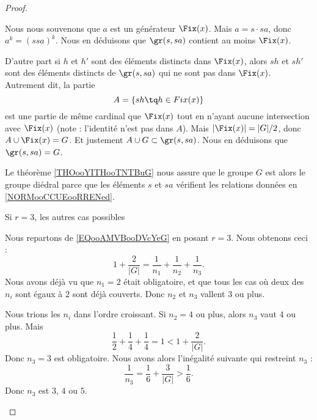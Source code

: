 \begin{proof}
\begin{subproof}
                Nous nous souvenons que \( a\) est un générateur \( \Fix(x)\). Mais \( a=s\cdot sa\), donc \( a^k=(ssa)^k\). Nous en déduisons que \( \gr(s,sa)\) contient au moins \( \Fix(x)\).

                D'autre part si \( h\) et \( h'\) sont des éléments distincts dans \( \Fix(x)\), alors \( sh\) et \( sh'\) sont des éléments distincts de \( \gr(s,sa)\) qui ne sont pas dans \( \Fix(x)\). Autrement dit, la partie
                \begin{equation}
                    A=\{ sh\tq h\in Fix(x) \}
                \end{equation}
                est une partie de même cardinal que \( \Fix(x)\) tout en n'ayant aucune intersection avec \( \Fix(x)\) (note : l'identité n'est pas dans \( A\)). Mais \( | \Fix(x) |=| G |/2\), donc \( A\cup\Fix(x)=G\). Et justement \( A\cup G\subset \gr(s,sa)\). Nous en déduisons que \( \gr(s,sa)=G\).

                Le théorème \ref{THOooYITHooTNTBuG} nous assure que le groupe \( G\) est alors le groupe diédral parce que les éléments \( s\) et \( sa\) vérifient les relations données en \ref{NORMooCCUEooRRENed}.

            \item[Si \( r=3\), les autres cas possibles]

                Nous repartons de \eqref{EQooAMVBooDVcYeG} en posant \( r=3\). Nous obtenons ceci :
                \begin{equation}
                    1+\frac{ 2 }{ | G | }=\frac{1}{ n_1 }+\frac{1}{ n_2 }+\frac{1}{ n_3 }.
                \end{equation}
                Nous avons déjà vu que \( n_1=2\) était obligatoire, et que tous les cas où deux des \( n_i\) sont égaux à \( 2\) sont déjà couverts. Donc \( n_2\) et \( n_3\) vallent \( 3\) ou plus.

                Nous trions les \( n_i\) dans l'ordre croissant. Si \( n_2=4\) ou plus, alors \( n_3\) vaut \( 4\) ou plus. Mais
                \begin{equation}
                    \frac{ 1 }{2}+\frac{1}{ 4 }+\frac{1}{ 4 }=1<1+\frac{ 2 }{ | G | }.
                \end{equation}
                Donc \( n_3=3\) est obligatoire. Nous avons alors l'inégalité suivante qui restreint \( n_3\) :
                \begin{equation}
                    \frac{1}{ n_3 }=\frac{1}{ 6 }+\frac{ 3 }{ | G | }>\frac{1}{ 6 }.
                \end{equation}
                Donc \( n_3\) est \( 3\), \( 4\) ou \( 5\). 


\end{subproof}
\end{proof}
